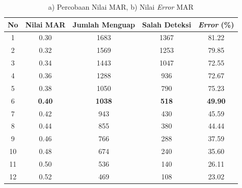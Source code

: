         
            \begin{table}[h]
            \centering
            \caption{a) Percobaan Nilai MAR, b) Nilai \textit{Error} MAR}
            \begin{tabular}{ccccc}
                \toprule
                \textbf{No} &\textbf{Nilai MAR} & \textbf{Jumlah Menguap} & \textbf{Salah Deteksi} & \textbf{\textit{Error} (\%)} \\
                \midrule
                          1 & 0.30 & 1683 & 1367 &  81.22 \\
                          2 & 0.32 & 1569 & 1253 & 79.85 \\
                          3 & 0.34 & 1443 & 1047 & 72.55 \\
                          4 & 0.36 & 1288 & 936  & 72.67 \\
                          5 & 0.38 & 1050 & 790  & 75.23\\
                         6 & \textbf{0.40} & \textbf{1038}& \textbf{518} &  \textbf{49.90} \\
                          7 & 0.42 & 943 & 430 & 45.59 \\
                          8 & 0.44 & 855 & 380 & 44.44 \\
                          9 & 0.46 & 766 & 288 & 37.59 \\
                          10 & 0.48 & 674 & 240 & 35.60 \\
                          11 & 0.50 & 536 & 140  & 26.11 \\
                          12 & 0.52 & 469 & 108 & 23.02 \\
                         
                    \bottomrule
                \end{tabular}
                \label{Penentuan Nilai MAR}
            \end{table}




